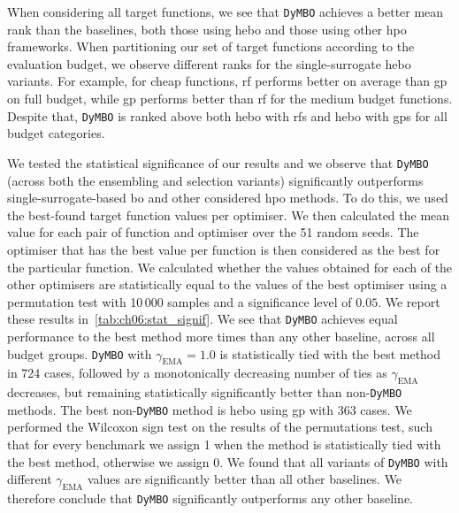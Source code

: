 When considering all target functions, we see that \texttt{DyMBO} achieves a better mean rank than the baselines, both those using \gls{hebo} and those using other \gls{hpo} frameworks. When partitioning our set of target functions according to the evaluation budget, we observe different ranks for the single-surrogate \gls{hebo} variants. For example, for cheap functions, \gls{rf} performs better on average than \gls{gp} on full budget, while \gls{gp} performs better than \gls{rf} for the medium budget functions. Despite that, \texttt{DyMBO} is ranked above both \gls{hebo} with \glspl{rf} and \gls{hebo} with \glspl{gp} for all budget categories.

We tested the statistical significance of our results
and we observe that \texttt{DyMBO} (across both the ensembling and selection variants)
significantly outperforms single-surrogate-based \gls{bo} and other considered \gls{hpo} methods.
To do this, we used the best-found target function values per optimiser.
We then calculated the mean value for each pair of function and optimiser over the 51 random seeds.
The optimiser that has the best value per function is then considered as the best for the particular function.
We calculated whether the values obtained for each of the other optimisers are statistically equal to the values of the best optimiser using a permutation test with 10\,000 samples and a significance level of $0.05$.
We report these results in~\cref{tab:ch06:stat_signif}.
We see that \texttt{DyMBO} achieves equal performance to the best method more times than any other baseline, across all budget groups.
\texttt{DyMBO} with $\gamma_{\mathrm{EMA}} = 1.0$ is statistically tied with the best method in 724 cases, followed by a monotonically decreasing number of ties as $\gamma_{\mathrm{EMA}}$ decreases, but remaining statistically significantly better than non-\texttt{DyMBO} methods.
The best non-\texttt{DyMBO} method is \gls{hebo} using \gls{gp} with 363 cases. We performed the Wilcoxon sign test on the results of the permutations test, such that for every benchmark we assign 1 when the method is statistically tied with the best method, otherwise we assign 0. We found that
all variants of \texttt{DyMBO} with different $\gamma_{\mathrm{EMA}}$ values are significantly better than all other baselines.
We therefore conclude that \texttt{DyMBO} significantly outperforms any other baseline.

